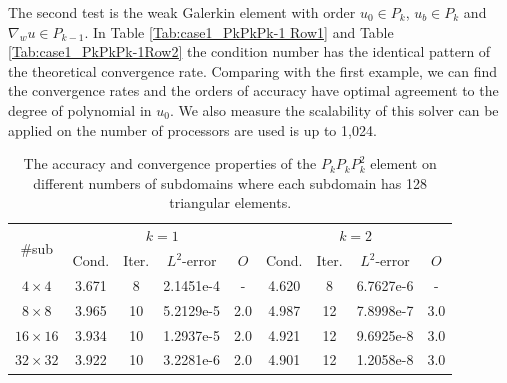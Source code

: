 				
				
				The second test is the weak Galerkin element with order $ u_{0} \in P_{k} $, $ u_{b} \in P_{k} $ and $ \nabla_{w}u \in P_{k - 1} $. In Table \ref{Tab:case1_PkPkPk-1 Row1} and Table \ref{Tab:case1_PkPkPk-1Row2} the condition number has the identical pattern of the theoretical convergence rate. Comparing with the first example, we can find the convergence rates and the orders of accuracy have optimal agreement to the degree of polynomial in $ u_{0} $. We also measure the scalability of this solver can be applied on the number of processors are used is up to 1,024.
				\vspace{1cm}
				
				\begin{table}[H]
					\vspace{-10pt}
					\setlength{\tabcolsep}{1pt} {
						\vspace{-5pt}
						\begin{center}
							\begin{tabular}{c|cccc|cccc}
								\hline
								\multirow{2}{*}{\#sub} &\multicolumn{4}{c|}{$k=1$} &\multicolumn{4}{c}{$k=2$}\\ 
								& Cond.   & Iter. &$L^2$-error & $O$  &  Cond.   & Iter. &$L^2$-error & $O$ \\
								\hline
								$4\times 4$     &3.671 & 8  &2.1451e-4 &- &4.620 &8   &6.7627e-6 &- \\
								$8\times 8$     &3.965 &10 &5.2129e-5 &2.0  &4.987 &12 &7.8998e-7 &3.0 \\
								$16\times 16$ &3.934 &10 &1.2937e-5 &2.0  &4.921 &12 &9.6925e-8 &3.0  \\
								$32\times 32$ &3.922 &10 &3.2281e-6 &2.0  &4.901 &12 &1.2058e-8 &3.0\\
								\hline	
							\end{tabular}
						\end{center} }
						\caption{The accuracy and convergence properties of the $P_{k}P_{k}P_{k}^2$ element on different numbers of subdomains where each subdomain has 128 triangular elements. }
						\label{Tab:case1_PkPkPk Row1}
					\end{table}
					
